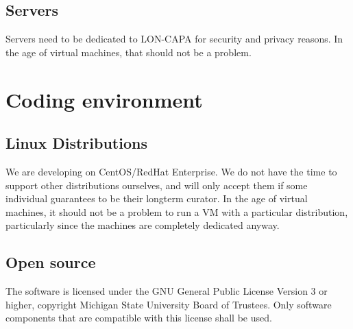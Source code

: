\subsection{Servers}
Servers need to be dedicated to LON-CAPA for security and privacy reasons. In the age of virtual machines, that should not be a problem.
\section{Coding environment}
\subsection{Linux Distributions}
We are developing on CentOS/RedHat Enterprise. We do not have the time to support other distributions ourselves, and will only accept them if some individual guarantees to be their longterm curator. In the age of virtual machines, it should not be a problem to run a VM with a particular distribution, particularly since the machines are completely dedicated anyway.
\subsection{Open source}
The software is licensed under the GNU General Public License Version 3 or higher, copyright Michigan State University Board of Trustees. Only software components that are compatible with this license shall be used.
